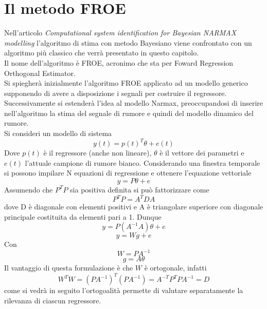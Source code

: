 
\chapter{Il metodo FROE}
Nell'articolo \emph{Computational system identification for Bayesian
NARMAX modelling} l'algoritmo di stima con metodo Bayesiano viene confrontato con un algoritmo più classico che verrà presentato in questo capitolo.\\
Il nome dell'algoritmo è FROE, acronimo che sta per Foward Regression Orthogonal Estimator.\\
Si spiegherà inizialmente l'algoritmo FROE applicato ad un modello generico supponendo di avere a disposizione i segnali per costruire il regressore. Successivamente si estenderà l'idea al modello Narmax, preoccupandosi di inserire nell'algoritmo la stima del segnale di rumore e quindi del modello dinamico del rumore.\\
Si consideri un modello di sistema
\begin{equation}
y(t)=p(t)^T \theta +e(t)
\end{equation}
Dove $p(t)$ è il regressore (anche non lineare), $\theta$ è il vettore dei parametri e $e(t)$ l'attuale campione di rumore bianco.
Considerando una finestra temporale si possono impilare N equazioni di regressione
e ottenere l'equazione vettoriale
\begin{equation}
y=P\theta +e
\end{equation}
Assumendo che $P^TP$ sia positiva definita 
si può fattorizzare come
\begin{equation}
P^TP=A^TDA
\end{equation}
dove D è diagonale con elementi positivi e A è triangolare superiore con diagonale principale costituita da elementi pari a 1.
Dunque
\begin{equation}
y=P(A^{-1}A)\theta +e
\end{equation}
\begin{equation}
y=Wg+e
\end{equation}
Con
\begin{equation}
W=PA^{-1} \label{wdef}
\end{equation}
\begin{equation}
g=A\theta
\end{equation}
Il vantaggio di questa formulazione è che $W$ è ortogonale, infatti
\begin{equation}
W^TW=(PA^{-1})^T(PA^{-1})=A^{-T}P^{T}PA^{-1}=D \label{ort}
\end{equation}
come si vedrà in seguito l'ortogoalità permette di valutare separatamente la rilevanza di ciascun regressore.
